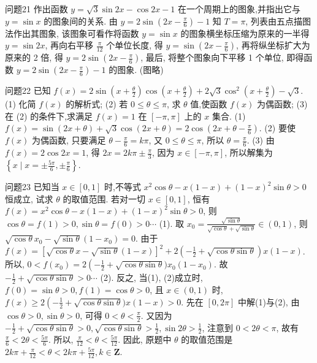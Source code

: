 问题21 作出函数 $y=\sqrt{3} \sin 2 x-\cos 2 x-1$ 在一个周期上的图象,并指出它与 $y=\sin x$ 的图象间的关系.
由 $y=2 \sin \left(2 x-\frac{\pi}{6}\right)-1$ 知 $T=\pi$, 列表由五点描图法作出其图象, 该图象可看作将函数 $y=\sin x$ 的图象横坐标压缩为原来的一半得 $y=\sin 2 x$, 再向右平移 $\frac{\pi}{12}$ 个单位长度, 得 $y=\sin \left(2 x-\frac{\pi}{6}\right)$, 再将纵坐标扩大为原来的 2 倍, 得 $y=2 \sin \left(2 x-\frac{\pi}{6}\right)$, 最后, 将整个图象向下平移 1 个单位, 即得函数 $y= 2 \sin \left(2 x-\frac{\pi}{6}\right)-1$ 的图象.
(图略)



问题22 已知 $f(x)=2 \sin \left(x+\frac{\theta}{2}\right) \cos \left(x+\frac{\theta}{2}\right)+2 \sqrt{3} \cos ^2\left(x+\frac{\theta}{2}\right)-\sqrt{3}$.
(1) 化简 $f(x)$ 的解析式;
(2) 若 $0 \leqslant \theta \leqslant \pi$, 求 $\theta$ 值,使函数 $f(x)$ 为偶函数;
(3) 在 (2) 的条件下,求满足 $f(x)=1$ 在 $[-\pi, \pi]$ 上的 $x$ 集合.
(1) $f(x)=\sin (2 x+\theta)+\sqrt{3} \cos (2 x+\theta)=2 \cos \left(2 x+\theta-\frac{\pi}{6}\right)$.
(2) 要使 $f(x)$ 为偶函数, 只要满足 $\theta-\frac{\pi}{6}=k \pi$, 又 $0 \leqslant \theta \leqslant \pi$, 所以 $\theta=\frac{\pi}{6}$.
(3) 由 $f(x)=2 \cos 2 x=1$, 得 $2 x=2 k \pi \pm \frac{\pi}{3}$, 因为 $x \in[-\pi, \pi]$, 所以解集为 $\left\{x \mid x= \pm \frac{5 \pi}{6}, \pm \frac{\pi}{6}\right\}$.



问题23 已知当 $x \in[0,1]$ 时,不等式 $x^2 \cos \theta-x(1-x)+(1-x)^2 \sin \theta>0$ 恒成立, 试求 $\theta$ 的取值范围.
若对一切 $x \in[0,1]$, 恒有 $f(x)=x^2 \cos \theta-x(1-x)+(1-x)^2 \sin \theta>0$, 则 $\cos \theta=f(1)>0, \sin \theta=f(0)>0 \cdots$ (1). 取 $x_0=\frac{\sqrt{\sin \theta}}{\sqrt{\cos \theta}+\sqrt{\sin \theta}} \in(0,1)$, 则 $\sqrt{\cos \theta} x_0-\sqrt{\sin \theta}\left(1-x_0\right)=0$. 由于 $f(x)=[\sqrt{\cos \theta} x-\sqrt{\sin \theta}(1- x)]^2+2\left(-\frac{1}{2}+\sqrt{\cos \theta \sin \theta}\right) x(1-x)$. 所以, $0<f\left(x_0\right)=2\left(-\frac{1}{2}+\right. \sqrt{\cos \theta \sin \theta}) x_0\left(1-x_0\right)$. 故 $-\frac{1}{2}+\sqrt{\cos \theta \sin \theta}>0 \cdots$ (2). 反之, 当(1), (2)成立时, $f(0)=\sin \theta>0, f(1)=\cos \theta>0$, 且 $x \in(0,1)$ 时, $f(x) \geqslant 2\left(-\frac{1}{2}+\right. \sqrt{\cos \theta \sin \theta}) x(1-x)>0$. 先在 $[0,2 \pi]$ 中解(1)与(2), 由 $\cos \theta>0, \sin \theta>0$, 可得 $0<\theta<\frac{\pi}{2}$. 又因为 $-\frac{1}{2}+\sqrt{\cos \theta \sin \theta}>0, \sqrt{\cos \theta \sin \theta}>\frac{1}{2}, \sin 2 \theta> \frac{1}{2}$, 注意到 $0<2 \theta<\pi$, 故有 $\frac{\pi}{6}<2 \theta<\frac{5 \pi}{6}$. 所以, $\frac{\pi}{12}<\theta<\frac{5 \pi}{12}$. 因此, 原题中 $\theta$ 的取值范围是 $2 k \pi+\frac{\pi}{12}<\theta<2 k \pi+\frac{5 \pi}{12}, k \in \mathbf{Z}$.




